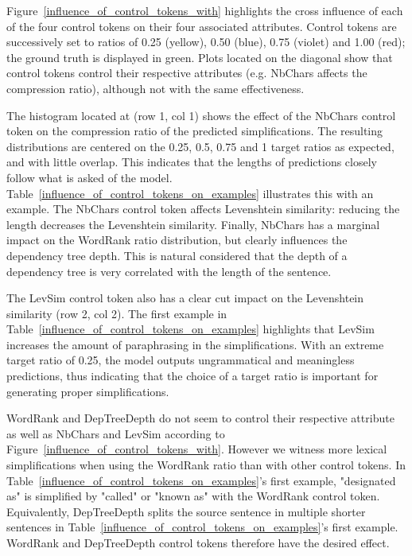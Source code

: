 \documentclass[10pt, a4paper]{article}
\begin{document}
Figure~\ref{influence_of_control_tokens_with} highlights the cross influence of each of the four control tokens on their four associated attributes. Control tokens are successively set to ratios of 0.25 (yellow), 0.50 (blue), 0.75 (violet) and 1.00 (red); the ground truth is displayed in green.
Plots located on the diagonal show that control tokens control their respective attributes (e.g. NbChars affects the compression ratio), although not with the same effectiveness.

The histogram located at (row 1, col 1) shows the effect of the NbChars control token on the compression ratio of the predicted simplifications.
The resulting distributions are centered on the 0.25, 0.5, 0.75 and 1 target ratios as expected, and with little overlap.
This indicates that the lengths of predictions closely follow what is asked of the model. Table~\ref{influence_of_control_tokens_on_examples} illustrates this with an example.
The NbChars control token affects Levenshtein similarity: reducing the length decreases the Levenshtein similarity.
Finally, NbChars has a marginal impact on the WordRank ratio distribution, but clearly influences the dependency tree depth. This is natural considered that the depth of a dependency tree is very correlated with the length of the sentence.

The LevSim control token also has a clear cut impact on the Levenshtein similarity (row 2, col 2).
The first example in Table~\ref{influence_of_control_tokens_on_examples} highlights that LevSim increases the amount of paraphrasing in the simplifications. With an extreme target ratio of 0.25, the model outputs ungrammatical and meaningless predictions, thus indicating that the choice of a target ratio is important for generating proper simplifications.

WordRank and DepTreeDepth do not seem to control their respective attribute as well as NbChars and LevSim according to Figure~\ref{influence_of_control_tokens_with}.
However we witness more lexical simplifications when using the WordRank ratio than with other control tokens. In Table~\ref{influence_of_control_tokens_on_examples}'s first example, "designated as" is simplified by "called" or "known as" with the WordRank control token.
Equivalently, DepTreeDepth splits the source sentence in multiple shorter sentences in Table~\ref{influence_of_control_tokens_on_examples}'s first example.
WordRank and DepTreeDepth control tokens therefore have the desired effect.
\end{document}
